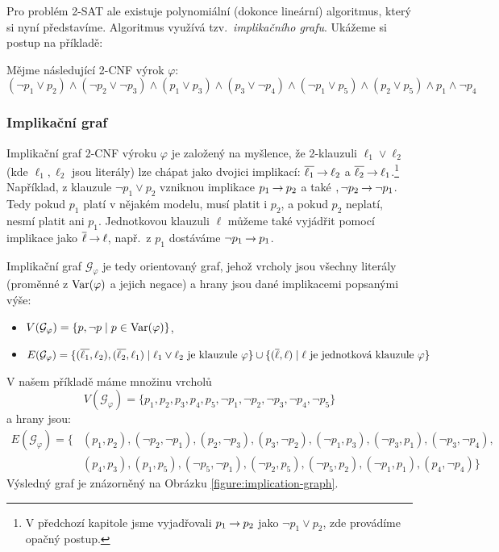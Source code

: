 Pro problém 2-SAT ale existuje polynomiální (dokonce lineární) algoritmus, který si nyní představíme. Algoritmus využívá tzv.\ \emph{implikačního grafu}. Ukážeme si postup na příkladě:
\begin{example}
    Mějme následující 2-CNF výrok $\varphi$:
    $$
    (\neg p_1 \lor p_2) \land (\neg p_2 \lor \neg p_3) \land (p_1\lor p_3) \land (p_3\lor \neg p_4)\land (\neg p_1\lor p_5)\land (p_2\lor p_5)\land p_1\land \neg p_4
    $$
\end{example}

\subsubsection{Implikační graf}

Implikační graf 2-CNF výroku $\varphi$ je založený na myšlence, že 2-klauzuli $\ell_1\lor \ell_2$ (kde $\ell_1,\ell_2$ jsou literály) lze chápat jako dvojici implikací: $\overline{\ell_1}\mathbin{\rightarrow}\ell_2$ a $\overline{\ell_2}\mathbin{\rightarrow} \ell_1$.\footnote{V předchozí kapitole jsme vyjadřovali $p_1\mathbin{\rightarrow} p_2$ jako $\neg p_1\lor p_2$, zde provádíme opačný postup.} Například, z klauzule $\neg p_1\lor p_2$ vzniknou implikace $p_1\mathbin{\rightarrow} p_2$ a také $,\neg p_2\mathbin{\rightarrow} \neg p_1$. Tedy pokud $p_1$ platí v nějakém modelu, musí platit i $p_2$, a pokud $p_2$ neplatí, nesmí platit ani $p_1$. Jednotkovou klauzuli $\ell$ můžeme také vyjádřit pomocí implikace jako $\overline{\ell}\mathbin{\rightarrow}\ell$, např.\ z $p_1$ dostáváme $\neg p_1\mathbin{\rightarrow} p_1$.

Implikační graf $\mathcal G_\varphi$ je tedy orientovaný graf, jehož vrcholy jsou všechny literály (proměnné z $\operatorname{Var}(\varphi)$ a jejich negace) a hrany jsou dané implikacemi popsanými výše: 
\begin{itemize}
    \item $V(\mathcal G_\varphi) = \{p, \neg p \mid p\in\operatorname{Var}(\varphi)\}$,
    \item $E(\mathcal G_\varphi) = \{(\overline{\ell_1},\ell_2), (\overline{\ell_2},\ell_1)\mid \ell_1\lor \ell_2\text{ je klauzule }\varphi\}\mathbin{\cup}\{(\overline{\ell},\ell)\mid \ell \text{ je jednotková klauzule }\varphi\}$
\end{itemize} 

V našem příkladě máme množinu vrcholů 
$$
V(\mathcal G_\varphi)=\{p_1,p_2,p_3,p_4,p_5,\neg p_1,\neg p_2,\neg p_3,\neg p_4,\neg p_5\}
$$ 
a hrany jsou:
\begin{align*}
    E(\mathcal G_\varphi)=\{&(p_1,p_2),(\neg p_2,\neg p_1),(p_2,\neg p_3),(p_3,\neg p_2),(\neg p_1,p_3),(\neg p_3,p_1),(\neg p_3,\neg p_4),
    \\&(p_4,p_3),(p_1,p_5),(\neg p_5,\neg p_1),(\neg p_2,p_5),(\neg p_5,p_2),(\neg p_1,p_1),(p_4,\neg p_4)\}
\end{align*}
Výsledný graf je znázorněný na Obrázku \ref{figure:implication-graph}.

